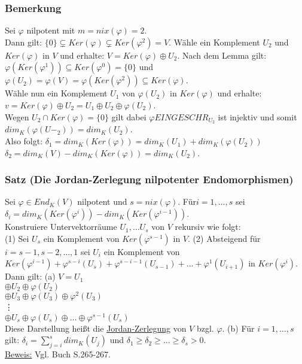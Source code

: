 \documentclass[a4paper]{article}
\newcommand{\ul}{\underline}
\let\phi\varphi
\begin{document}
\subsubsection{Bemerkung}
Sei \(\phi\) nilpotent mit \(m=nix(\phi)=2\).\\
Dann gilt: \(\{0\}\subsetneq Ker(\phi)\subsetneq Ker(\phi^2) =V\). Wähle ein Komplement \(U_2\) und \(Ker(\phi)\) in \(V\) und erhalte: \(V = Ker(\phi)\oplus U_2\).
Nach dem Lemma gilt: \(\phi(Ker(\phi^1))\subseteq Ker(\phi^0)=\{0\}\) und \(\phi(U_2)=\phi(V)=\phi(Ker(\phi^2))\subseteq Ker(\phi)\).\\
Wähle nun ein Komplement \(U_1\) von \(\phi(U_2)\) in \(Ker(\phi)\) und erhalte: \(v=Ker(\phi)\oplus U_2=U_1\oplus U_2\oplus \phi(U_2)\).\\
Wegen \(U_2\cap Ker(\phi)=\{0\}\) gilt dabei \(\phi EINGESCHR_{U_2}\) ist injektiv und somit \(dim_K(\phi(U-_2))=dim_K(U_2)\).\\
Also folgt: \(\delta_1=dim_K(Ker(\phi))=dim_K(U_1)+dim_K(\phi(U_2))\)\\
\(\delta_2=dim_K(V)-dim_K(Ker(\phi))=dim_K(U_2)\).
\subsubsection{Satz (Die Jordan-Zerlegung nilpotenter Endomorphismen)}
Sei \(\phi\in End_K(V)\) nilpotent und \(s=nix(\phi)\). Für\( i=1,\dots,s\) sei \(\delta_i=dim_K(Ker(\phi^i))-dim_K(Ker(\phi^{i-1}))\).\\
Konstruiere Untervektorräume \(U_1,\dots U_s\) von \(V\) rekursiv wie folgt:\\
(1) Sei \(U_s\) ein Komplement von \(Ker(\phi^{s-1})\) in \(V\).
(2) Absteigend für \(i=s-1, s-2,\dots, 1\) sei \(U_i\) ein Komplement von \(Ker(\phi^{i-1})+\phi^{s-i}(U_s)+\phi^{s-i-1}(U_{s-1})+\dots+\phi^1(U_{i+1})\) in \(Ker(\phi^i)\).\\
Dann gilt: (a) \(V=U_1\)\\
\(\oplus U_2\oplus \phi(U_2)\)\\
\(\oplus U_3\oplus \phi(U_3)\oplus \phi^2(U_3)\)\\
\vdots\\
\(\oplus U_s\oplus \phi(U_s)\oplus\dots\oplus\phi^{s-1}(U_s)\)\\
Diese Darstellung heißt die \ul{Jordan-Zerlegung} von \(V\) bzgl. \(\phi\).
(b) Für \(i=1,\dots,s\) gilt: \(\delta_i=\sum_{j=i}^{s} dim_K(U_j)\) und \(\delta_1\geq\delta_2\geq\dots\geq\delta_s>0\).\\
\ul{Beweis:} Vgl. Buch S.265-267.
\end{document}
